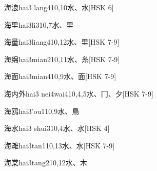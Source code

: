 \begin{EntryWithPhonetic}{海浪}{hai3 lang4}{10,10}{⽔、⽔}[HSK 6]
\end{EntryWithPhonetic}

\begin{EntryWithPhonetic}{海里}{hai3li3}{10,7}{⽔、⾥}
\end{EntryWithPhonetic}

\begin{EntryWithPhonetic}{海量}{hai3liang4}{10,12}{⽔、⾥}[HSK 7-9]
\end{EntryWithPhonetic}

\begin{EntryWithPhonetic}{海绵}{hai3mian2}{10,11}{⽔、⽷}[HSK 7-9]
\end{EntryWithPhonetic}

\begin{EntryWithPhonetic}{海面}{hai3mian4}{10,9}{⽔、⾯}[HSK 7-9]
\end{EntryWithPhonetic}

\begin{EntryWithPhonetic}{海内外}{hai3 nei4wai4}{10,4,5}{⽔、⼌、⼣}[HSK 7-9]
\end{EntryWithPhonetic}

\begin{EntryWithPhonetic}{海鸥}{hai3'ou1}{10,9}{⽔、⿃}
\end{EntryWithPhonetic}

\begin{EntryWithPhonetic}{海水}{hai3 shui3}{10,4}{⽔、⽔}[HSK 4]
\end{EntryWithPhonetic}

\begin{EntryWithPhonetic}{海滩}{hai3tan1}{10,13}{⽔、⽔}[HSK 7-9]
\end{EntryWithPhonetic}

\begin{EntryWithPhonetic}{海棠}{hai3tang2}{10,12}{⽔、⽊}
\end{EntryWithPhonetic}

